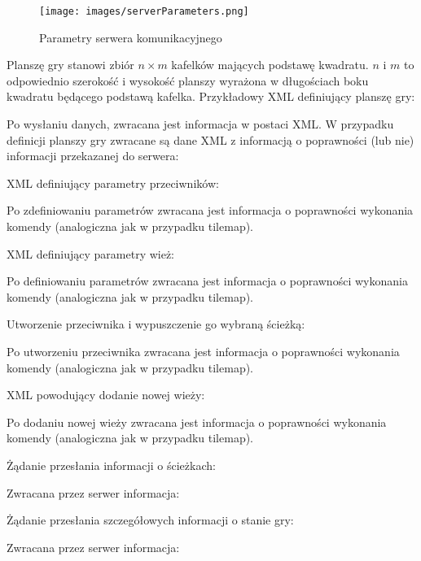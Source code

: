 \begin{figure}
\texttt{[image: images/serverParameters.png]}
\caption{Parametry serwera komunikacyjnego}
\label{Fig:serverParameters}
\end{figure} 

Planszę gry stanowi zbiór $n \times m$ kafelków mających podstawę kwadratu. $n$ i $m$ to odpowiednio szerokość i wysokość planszy wyrażona w długościach boku kwadratu będącego podstawą kafelka. Przykładowy XML  definiujący planszę gry:


Po wysłaniu danych, zwracana jest informacja w postaci XML. W przypadku definicji planszy gry zwracane są dane XML z informacją o poprawności (lub nie) informacji przekazanej do serwera:


XML definiujący parametry przeciwników:


Po zdefiniowaniu parametrów zwracana jest informacja o poprawności wykonania komendy (analogiczna jak w przypadku tilemap). 

XML definiujący parametry wież:


Po definiowaniu parametrów zwracana jest informacja o poprawności wykonania komendy (analogiczna jak w przypadku tilemap). 

Utworzenie przeciwnika i wypuszczenie go wybraną ścieżką:


Po utworzeniu przeciwnika zwracana jest informacja o poprawności wykonania komendy (analogiczna jak w przypadku tilemap). 

XML powodujący dodanie nowej wieży:


Po dodaniu nowej wieży zwracana jest informacja o poprawności wykonania komendy (analogiczna jak w przypadku tilemap). 

Żądanie przesłania informacji o ścieżkach:


Zwracana przez serwer informacja:


Żądanie przesłania szczegółowych informacji o stanie gry:


Zwracana przez serwer informacja:

